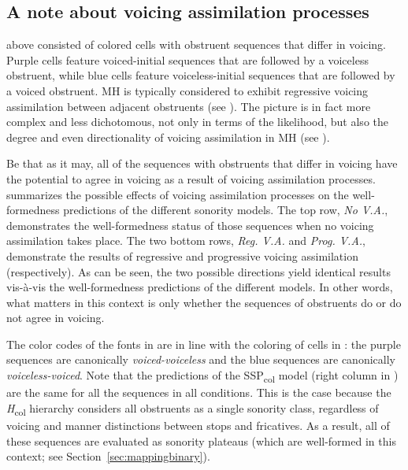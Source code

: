 \subsection{A note about voicing assimilation processes}\label{sec:vaNote}

 above consisted of colored cells with obstruent sequences that differ in voicing. Purple cells feature voiced-initial sequences that are followed by a voiceless obstruent, while blue cells feature voiceless-initial sequences that are followed by a voiced obstruent. MH is typically considered to exhibit regressive voicing assimilation between adjacent obstruents (see \citealt{barkai1972problemssk}). The picture is in fact more complex and less dichotomous, not only in terms of the likelihood, but also the degree and even directionality of voicing assimilation in MH (see \citealt{bolozky2006notesk, kreitman2010mixed, mizrachi2019notesk}).

Be that as it may, all of the sequences with obstruents that differ in voicing have the potential to agree in voicing as a result of voicing assimilation processes.  summarizes the possible effects of voicing assimilation processes on the well-formedness predictions of the different sonority models. The top row, \emph{No V.A.}, demonstrates the well-formedness status of those sequences when no voicing assimilation takes place. The two bottom rows, \emph{Reg. V.A.} and \emph{Prog. V.A.}, demonstrate the results of regressive and progressive voicing assimilation (respectively). As can be seen, the two possible directions yield identical results vis-à-vis the well-formedness predictions of the different models. In other words, what matters in this context is only whether the sequences of obstruents do or do not agree in voicing.

The color codes of the fonts in  are in line with the coloring of cells in : the purple sequences are canonically \emph{voiced-voiceless} and the blue sequences are canonically \emph{voiceless-voiced}. Note that the predictions of the SSP\textsubscript{col} model (right column in ) are the same for all the sequences in all conditions. This is the case because the \emph{H}\textsubscript{col} hierarchy considers all obstruents as a single sonority class, regardless of voicing and manner distinctions between stops and fricatives. As a result, all of these sequences are evaluated as sonority plateaus (which are well-formed in this context; see Section~\ref{sec:mappingbinary}).

